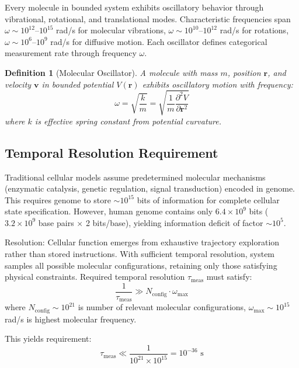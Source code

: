 \documentclass[11pt,a4paper]{article}
\newtheorem{definition}[theorem]{Definition}
\theoremstyle{remark}
\begin{document}
Every molecule in bounded system exhibits oscillatory behavior through vibrational, rotational, and translational modes. Characteristic frequencies span $\omega \sim 10^{12}$--$10^{15}$ rad/s for molecular vibrations, $\omega \sim 10^{10}$--$10^{12}$ rad/s for rotations, $\omega \sim 10^6$--$10^9$ rad/s for diffusive motion. Each oscillator defines categorical measurement rate through frequency $\omega$.

\begin{definition}[Molecular Oscillator]
\label{def:molecular_oscillator}
A molecule with mass $m$, position $\mathbf{r}$, and velocity $\mathbf{v}$ in bounded potential $V(\mathbf{r})$ exhibits oscillatory motion with frequency:
\begin{equation}
\omega = \sqrt{\frac{k}{m}} = \sqrt{\frac{1}{m}\frac{\partial^2 V}{\partial \mathbf{r}^2}}
\end{equation}
where $k$ is effective spring constant from potential curvature.
\end{definition}

\subsection{Temporal Resolution Requirement}

Traditional cellular models assume predetermined molecular mechanisms (enzymatic catalysis, genetic regulation, signal transduction) encoded in genome. This requires genome to store $\sim 10^{15}$ bits of information for complete cellular state specification. However, human genome contains only $6.4 \times 10^9$ bits ($3.2 \times 10^9$ base pairs $\times$ 2 bits/base), yielding information deficit of factor $\sim 10^5$.

Resolution: Cellular function emerges from exhaustive trajectory exploration rather than stored instructions. With sufficient temporal resolution, system samples all possible molecular configurations, retaining only those satisfying physical constraints. Required temporal resolution $\tau_{\text{meas}}$ must satisfy:
\begin{equation}
\frac{1}{\tau_{\text{meas}}} \gg N_{\text{config}} \cdot \omega_{\text{max}}
\end{equation}
where $N_{\text{config}} \sim 10^{21}$ is number of relevant molecular configurations, $\omega_{\text{max}} \sim 10^{15}$ rad/s is highest molecular frequency.

This yields requirement:
\begin{equation}
\tau_{\text{meas}} \ll \frac{1}{10^{21} \times 10^{15}} = 10^{-36} \text{ s}
\end{equation}
\end{document}
